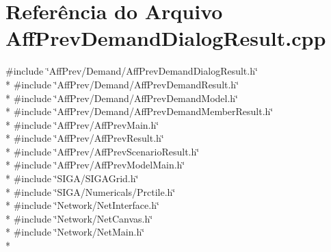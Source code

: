 \section{Referência do Arquivo Aff\+Prev\+Demand\+Dialog\+Result.\+cpp}
\label{_aff_prev_demand_dialog_result_8cpp}
{\ttfamily \#include \char`\"{}Aff\+Prev/\+Demand/\+Aff\+Prev\+Demand\+Dialog\+Result.\+h\char`\"{}}\\*
{\ttfamily \#include \char`\"{}Aff\+Prev/\+Demand/\+Aff\+Prev\+Demand\+Result.\+h\char`\"{}}\\*
{\ttfamily \#include \char`\"{}Aff\+Prev/\+Demand/\+Aff\+Prev\+Demand\+Model.\+h\char`\"{}}\\*
{\ttfamily \#include \char`\"{}Aff\+Prev/\+Demand/\+Aff\+Prev\+Demand\+Member\+Result.\+h\char`\"{}}\\*
{\ttfamily \#include \char`\"{}Aff\+Prev/\+Aff\+Prev\+Main.\+h\char`\"{}}\\*
{\ttfamily \#include \char`\"{}Aff\+Prev/\+Aff\+Prev\+Result.\+h\char`\"{}}\\*
{\ttfamily \#include \char`\"{}Aff\+Prev/\+Aff\+Prev\+Scenario\+Result.\+h\char`\"{}}\\*
{\ttfamily \#include \char`\"{}Aff\+Prev/\+Aff\+Prev\+Model\+Main.\+h\char`\"{}}\\*
{\ttfamily \#include \char`\"{}S\+I\+G\+A/\+S\+I\+G\+A\+Grid.\+h\char`\"{}}\\*
{\ttfamily \#include \char`\"{}S\+I\+G\+A/\+Numericals/\+Prctile.\+h\char`\"{}}\\*
{\ttfamily \#include \char`\"{}Network/\+Net\+Interface.\+h\char`\"{}}\\*
{\ttfamily \#include \char`\"{}Network/\+Net\+Canvas.\+h\char`\"{}}\\*
{\ttfamily \#include \char`\"{}Network/\+Net\+Main.\+h\char`\"{}}\\*
